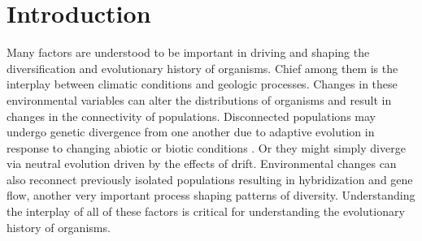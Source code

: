 

\section{Introduction}

Many factors are understood to be important in driving and shaping the 
diversification and evolutionary history of organisms. 
Chief among them is the interplay between climatic conditions and geologic processes.
Changes in these environmental variables can alter the distributions of organisms
and result in changes in the connectivity of populations.
Disconnected populations may undergo genetic divergence from one another due 
to adaptive evolution in response to changing abiotic or biotic conditions . 
Or they might simply diverge via neutral evolution driven by the effects of drift.
Environmental changes can also reconnect previously isolated populations resulting
in hybridization and gene flow, another very important process shaping patterns of diversity.
Understanding the interplay of all of these factors is critical for understanding
the evolutionary history of organisms.


